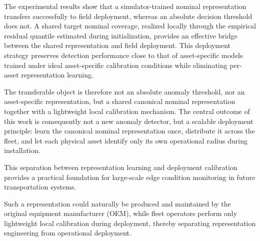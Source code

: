 \documentclass[11pt,a4paper]{article}
\begin{document}
The experimental results show that a simulator-trained nominal representation transfers
successfully to field deployment, whereas an absolute decision threshold does not.
A shared target nominal coverage, realized locally through the empirical residual quantile estimated during initialization, 
provides an effective bridge between the shared representation and field deployment. This deployment strategy preserves detection performance
close to that of asset-specific models trained under ideal asset-specific calibration conditions
while eliminating per-asset representation learning.

The transferable object is therefore not an absolute anomaly threshold, nor an asset-specific
representation, but a shared canonical nominal representation together with a lightweight local
calibration mechanism. The central outcome of this work is consequently not a new anomaly
detector, but a scalable deployment principle: learn the canonical nominal representation once,
distribute it across the fleet, and let each physical asset identify only its own operational
radius during installation.

This separation between representation learning and deployment calibration provides a practical
foundation for large-scale edge condition monitoring in future transportation systems.

Such a representation could naturally be produced and maintained by the original equipment manufacturer (OEM), 
while fleet operators perform only lightweight local calibration during deployment, thereby separating representation engineering from operational deployment.

\printbibliography
\end{document}
